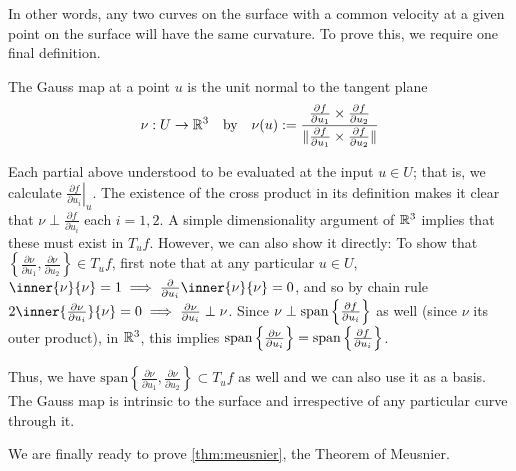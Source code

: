 	
	In other words, any two curves on the surface with a common velocity at a given point on the surface will have the same curvature. To prove this, we require one final definition.
	
	\begin{defn} \label{def:gauss-map}
		The Gauss map at a point $u$  is the unit normal to the tangent plane
		\[\nu : U \to \mathbb{R}^3 \quad\textrm{by}\quad  \nu(u) :=
		\frac{\frac{\partial f}{\partial u_1} \times \frac{\partial f}{\partial u_2}}
		{\Vert\frac{\partial f}{\partial u_1} \times \frac{\partial f}{\partial u_2}\Vert} \]
	\end{defn}
	Each partial above understood to be evaluated at the input $u \in U$; that is, we calculate $\left.\frac{\partial f}{\partial u_i}\right|_u$.
	The existence of the cross product in its definition makes it clear that $\nu \perp \frac{\partial f}{\partial u_i}$ each $i=1,2$. A simple dimensionality argument of $\mathbb{R}^3$ implies that these must exist in $T_uf$. However, we can also show it directly: 
	To show that $\left\{\frac{\partial \nu}{\partial u_1} , \frac{\partial \nu}{\partial u_2}\right\} \in T_u f$,
	first note that at any particular $u \in U$,
	$\inner{\nu}{\nu} = 1 \implies \frac{\partial}{\partial u_i} \inner{\nu}{\nu} = 0$,
	and so by chain rule $2\inner{\frac{\partial \nu}{\partial u_i}}{\nu} = 0
	\implies \frac{\partial \nu}{\partial u_i} \perp \nu $.
	Since $ \nu \perp \mathrm{span}\left\{\frac{\partial f}{\partial u_i}\right\} $ as well (since $\nu$ its outer product), in  $\mathbb{R}^3$, this implies
	$\spn\left\{\frac{\partial \nu}{\partial u_i}\right\} = %
	\spn\left\{\frac{\partial f}{\partial u_i}\right\}$.
	
	Thus, we have $\textrm{span}\left\{ \frac{\partial \nu}{\partial u_1}, \frac{\partial \nu}{\partial u_2}\right\} \subset T_u f$ as well and we can also use it as a basis.
  The Gauss map is intrinsic to the surface and irrespective of any particular curve through it.
	
	We are finally ready to prove \cref{thm:meusnier}, the Theorem of Meusnier.
	
